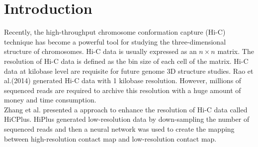 \section{Introduction}
Recently, the high-throughput chromosome conformation capture (Hi-C) technique has become a powerful tool for studying the three-dimensional structure of chromosomes. Hi-C data is usually expressed as an $n \times n$ matrix. The resolution of Hi-C data is defined as the bin size of each cell of the matrix. Hi-C data at kilobase level are requisite for future genome 3D structure studies. Rao et al.(2014) generated Hi-C data with 1 kilobase resolution. However, millions of sequenced reads are required to archive this resolution with a huge amount of money and time consumption.\\
Zhang et al. presented a approach to enhance the resolution of Hi-C data called HiCPlus. HiPlus generated low-resolution data by down-sampling the number of sequenced reads and then a neural network was used to create the mapping between high-resolution contact map and low-resolution contact map. 

\cite{Mizushima2011Autophagy}